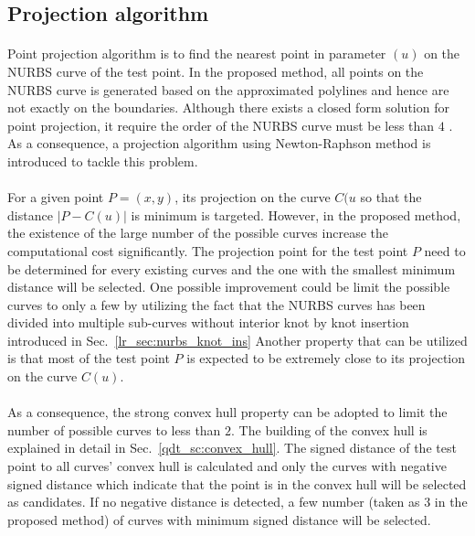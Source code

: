 \subsection{Projection algorithm}
\paragraph{}
Point projection algorithm is to find the nearest point in parameter $(u)$ on the NURBS curve of the test point.
In the proposed method, all points on the NURBS curve is generated based on the approximated polylines and hence are not exactly on the boundaries.
Although there exists a closed form solution for point projection, it require the order of the NURBS curve must be less than $4$ \citep{Pie1997}.
As a consequence, a projection algorithm \citep{MA200379} using Newton-Raphson method is introduced to tackle this problem.

\paragraph{}
For a given point $P=(x,y)$, its projection on the curve $C(u$ so that the distance $|P-C(u)|$ is minimum is targeted.
However, in the proposed method, the existence of the large number of the possible curves increase the computational cost significantly.
The projection point for the test point $P$ need to be determined for every existing curves and the one with the smallest minimum distance will be selected.
One possible improvement could be limit the possible curves to only a few by utilizing the fact that the NURBS curves has been divided into multiple sub-curves without interior knot by knot insertion introduced in Sec.~\ref{lr_sec:nurbs_knot_ins}
Another property that can be utilized is that most of the test point $P$ is expected to be extremely close to its projection on the curve $C(u)$.

\paragraph{}
As a consequence, the strong convex hull property can be adopted to limit the number of possible curves to less than $2$.
The building of the convex hull is explained in detail in Sec.~\ref{qdt_sc:convex_hull}.
The signed distance of the test point to all curves' convex hull is calculated and only the curves with negative signed distance which indicate that the point is in the convex hull will be selected as candidates.
If no negative distance is detected, a few number (taken as $3$ in the proposed method) of curves with minimum signed distance will be selected.


